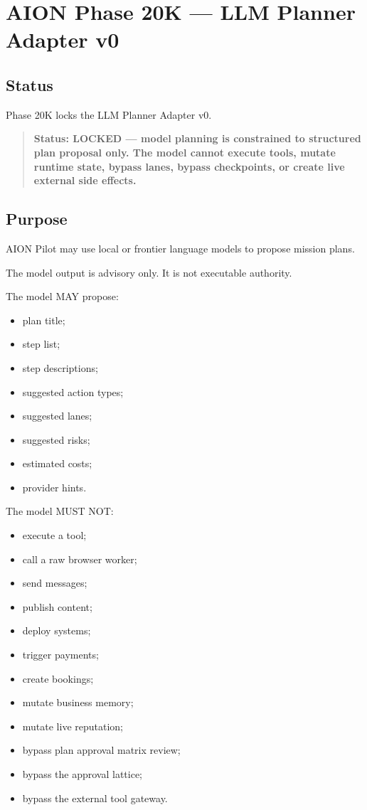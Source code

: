 \section{AION Phase 20K --- LLM Planner Adapter v0}
\label{sec:aion-phase20k-llm-planner-adapter}

\subsection{Status}

Phase 20K locks the LLM Planner Adapter v0.

\begin{quote}
\textbf{Status: LOCKED --- model planning is constrained to structured plan proposal only. The model cannot execute tools, mutate runtime state, bypass lanes, bypass checkpoints, or create live external side effects.}
\end{quote}

\subsection{Purpose}

AION Pilot may use local or frontier language models to propose mission plans.

The model output is advisory only. It is not executable authority.

The model MAY propose:

\begin{itemize}
  \item plan title;
  \item step list;
  \item step descriptions;
  \item suggested action types;
  \item suggested lanes;
  \item suggested risks;
  \item estimated costs;
  \item provider hints.
\end{itemize}

The model MUST NOT:

\begin{itemize}
  \item execute a tool;
  \item call a raw browser worker;
  \item send messages;
  \item publish content;
  \item deploy systems;
  \item trigger payments;
  \item create bookings;
  \item mutate business memory;
  \item mutate live reputation;
  \item bypass plan approval matrix review;
  \item bypass the approval lattice;
  \item bypass the external tool gateway.
\end{itemize}

